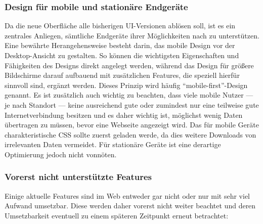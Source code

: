 \subsubsection{Design für mobile und stationäre Endgeräte}
Da die neue Oberfläche alle bisherigen UI-Versionen ablösen soll, ist es ein zentrales Anliegen, sämtliche Endgeräte ihrer Möglichkeiten nach zu unterstützen. Eine bewährte Herangehensweise besteht darin, das mobile Design vor der Desktop-Ansicht zu gestalten. So können die wichtigsten Eigenschaften und Fähigkeiten des Designs direkt angelegt werden, während das Design für größere Bildschirme darauf aufbauend mit zusätzlichen Features, die speziell hierfür sinnvoll sind, ergänzt werden. Dieses Prinzip wird häufig ``mobile-first''-Design genannt. 
Es ist zusätzlich auch wichtig zu beachten, dass viele mobile Nutzer --- je nach Standort --- keine ausreichend gute oder zumindest nur eine teilweise gute Internetverbindung besitzen und es daher wichtig ist, möglichst wenig Daten übertragen zu müssen, bevor eine Webseite angezeigt wird. Das für mobile Geräte charakteristische CSS sollte zuerst geladen werde, da dies weitere Downloads von irrelevanten Daten vermeidet. Für stationäre Geräte ist eine derartige Optimierung jedoch nicht vonnöten.

\subsubsection{Vorerst nicht unterstützte Features}
Einige aktuelle Features sind im Web entweder gar nicht oder nur mit sehr viel Aufwand umsetzbar. Diese werden daher vorerst nicht weiter beachtet und deren Umsetzbarkeit eventuell zu einem späteren Zeitpunkt erneut betrachtet:

